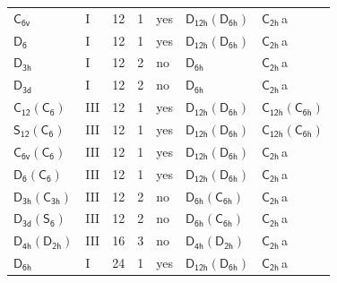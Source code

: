 \documentclass[10pt,a4paper]{article}
\numberwithin{equation}{section}
\newcommand{\grp}[1]{\mathsf{#1}}
\newcommand{\clsletter}[1]{\,{\scriptsize\color{black!55}#1}}
\begin{document}
{\begin{longtable}{@{}llrrlll@{}}
\href{../../../rotation/data/pdf/C6v.pdf}{$\grp{C_{6v}}$} & I & 12 & 1 & yes & \href{D12h-D6h.pdf}{$\grp{D_{12h}}(\grp{D_{6h}})$} & \href{../../../rotation/data/pdf/C2h.pdf}{$\grp{C_{2h}}$}\clsletter{a}\\
\href{../../../rotation/data/pdf/D6.pdf}{$\grp{D_{6}}$} & I & 12 & 1 & yes & \href{D12h-D6h.pdf}{$\grp{D_{12h}}(\grp{D_{6h}})$} & \href{../../../rotation/data/pdf/C2h.pdf}{$\grp{C_{2h}}$}\clsletter{a}\\
\href{../../../rotation/data/pdf/D3h.pdf}{$\grp{D_{3h}}$} & I & 12 & 2 & no & \href{../../../rotation/data/pdf/D6h.pdf}{$\grp{D_{6h}}$} & \href{../../../rotation/data/pdf/C2h.pdf}{$\grp{C_{2h}}$}\clsletter{a}\\
\href{../../../rotation/data/pdf/D3d.pdf}{$\grp{D_{3d}}$} & I & 12 & 2 & no & \href{../../../rotation/data/pdf/D6h.pdf}{$\grp{D_{6h}}$} & \href{../../../rotation/data/pdf/C2h.pdf}{$\grp{C_{2h}}$}\clsletter{a}\\
\href{C12-C6.pdf}{$\grp{C_{12}}(\grp{C_{6}})$} & III & 12 & 1 & yes & \href{D12h-D6h.pdf}{$\grp{D_{12h}}(\grp{D_{6h}})$} & \href{C12h-C6h.pdf}{$\grp{C_{12h}}(\grp{C_{6h}})$}\\
\href{S12-C6.pdf}{$\grp{S_{12}}(\grp{C_{6}})$} & III & 12 & 1 & yes & \href{D12h-D6h.pdf}{$\grp{D_{12h}}(\grp{D_{6h}})$} & \href{C12h-C6h.pdf}{$\grp{C_{12h}}(\grp{C_{6h}})$}\\
\href{C6v-C6.pdf}{$\grp{C_{6v}}(\grp{C_{6}})$} & III & 12 & 1 & yes & \href{D12h-D6h.pdf}{$\grp{D_{12h}}(\grp{D_{6h}})$} & \href{../../../rotation/data/pdf/C2h.pdf}{$\grp{C_{2h}}$}\clsletter{a}\\
\href{D6-C6.pdf}{$\grp{D_{6}}(\grp{C_{6}})$} & III & 12 & 1 & yes & \href{D12h-D6h.pdf}{$\grp{D_{12h}}(\grp{D_{6h}})$} & \href{../../../rotation/data/pdf/C2h.pdf}{$\grp{C_{2h}}$}\clsletter{a}\\
\href{D3h-C3h.pdf}{$\grp{D_{3h}}(\grp{C_{3h}})$} & III & 12 & 2 & no & \href{D6h-C6h.pdf}{$\grp{D_{6h}}(\grp{C_{6h}})$} & \href{../../../rotation/data/pdf/C2h.pdf}{$\grp{C_{2h}}$}\clsletter{a}\\
\href{D3d-S6.pdf}{$\grp{D_{3d}}(\grp{S_{6}})$} & III & 12 & 2 & no & \href{D6h-C6h.pdf}{$\grp{D_{6h}}(\grp{C_{6h}})$} & \href{../../../rotation/data/pdf/C2h.pdf}{$\grp{C_{2h}}$}\clsletter{a}\\
\href{D4h-D2h.pdf}{$\grp{D_{4h}}(\grp{D_{2h}})$} & III & 16 & 3 & no & \href{D4h-D2h.pdf}{$\grp{D_{4h}}(\grp{D_{2h}})$} & \href{../../../rotation/data/pdf/C2h.pdf}{$\grp{C_{2h}}$}\clsletter{a}\\
\href{../../../rotation/data/pdf/D6h.pdf}{$\grp{D_{6h}}$} & I & 24 & 1 & yes & \href{D12h-D6h.pdf}{$\grp{D_{12h}}(\grp{D_{6h}})$} & \href{../../../rotation/data/pdf/C2h.pdf}{$\grp{C_{2h}}$}\clsletter{a}\\

\end{longtable}}
\end{document}

